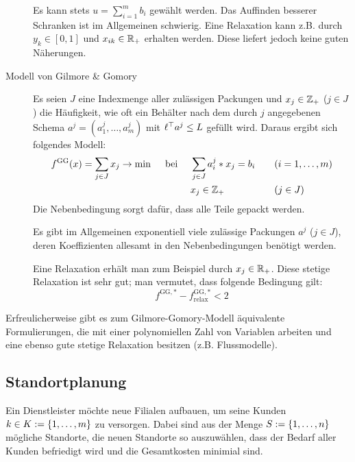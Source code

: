 \begin{description}
	Es kann stets $u = \sum_{i=1}^m b_i$ gewählt werden. Das Auffinden besserer Schranken ist im Allgemeinen schwierig.
	Eine Relaxation kann z.B. durch $y_k \in [0,1]$ und $x_{ik} \in \mathbb{R}_+$ erhalten werden. Diese liefert jedoch keine guten Näherungen.
	\item[Modell von Gilmore \& Gomory] Es seien $J$ eine Indexmenge aller zulässigen Packungen und $x_j \in \mathbb{Z}_+$ ($j \in J$) die Häufigkeit, wie oft ein Behälter nach dem durch $j$ angegebenen Schema $a^j = (a_1^j , \dots , a_m^j)$ mit $\ell^{\top} a^j \le L$ gefüllt wird.
	Daraus ergibt sich folgendes Modell:
	\begin{equation*}
		\begin{aligned}
		f^{\text{GG}}(x) = \sum_{j \in J} x_j \to \min \quad \text{ bei } \quad 
		& \sum_{j \in J} a_i^j * x_j = b_i \quad && (i = 1, \dots , m) \\
		& x_j \in \mathbb{Z}_+ && (j \in J)
		\end{aligned}
	\end{equation*}
	Die Nebenbedingung sorgt dafür, dass alle Teile gepackt werden.
	
	Es gibt im Allgemeinen exponentiell viele zulässige Packungen $a^j$ ($j \in J$), deren Koeffizienten allesamt in den Nebenbedingungen benötigt werden.
	
	Eine Relaxation erhält man zum Beispiel durch $x_j \in \mathbb{R}_+$. Diese stetige Relaxation ist sehr gut; man vermutet, dass folgende Bedingung gilt:
	\begin{equation*}
		f^{\text{GG}, \ast} - f^{\text{GG}, \ast}_\text{relax} < 2
	\end{equation*}
\end{description}

Erfreulicherweise gibt es zum Gilmore-Gomory-Modell äquivalente Formulierungen, die mit einer polynomiellen Zahl von Variablen arbeiten und eine ebenso gute stetige Relaxation besitzen (z.B. Flussmodelle).


\subsection{Standortplanung}
\label{subsec: 1.3.3}

Ein Dienstleister möchte neue Filialen aufbauen, um seine Kunden $k \in K \mathrel{:=} \left\{ 1, \dots , m \right\}$ zu versorgen. Dabei sind aus der Menge $S \mathrel{:=} \left\{ 1, \dots , n \right\}$ mögliche Standorte, die neuen Standorte so auszuwählen, dass der Bedarf aller Kunden befriedigt wird und die Gesamtkosten minimial sind.

